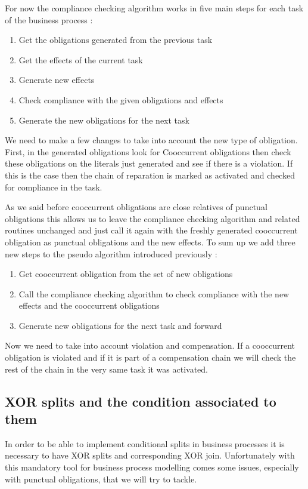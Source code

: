 \documentclass[10pt]{report}
\begin{document}
For now the compliance checking algorithm works in five main steps for each task of the business process :
\begin{enumerate}
\item Get the obligations generated from the previous task
\item Get the effects of the current task
\item Generate new effects
\item Check compliance with the given obligations and effects
\item Generate the new obligations for the next task
\end{enumerate}

We need to make a few changes to take into account the new type of obligation. First, in the generated obligations look for Cooccurrent obligations then check these obligations on the literals just generated and see if there is a violation. If this is the case then the chain of reparation is marked as activated and checked for compliance in the task.

As we said before cooccurrent obligations are close relatives of punctual obligations this allows us to leave the compliance checking algorithm and related routines unchanged and just call it again with the freshly generated cooccurrent obligation as punctual obligations and the new effects. To sum up we add three new steps to the pseudo algorithm introduced previously :
\begin{enumerate}
\item Get cooccurrent obligation from the set of new obligations
\item Call the compliance checking algorithm to check compliance with the new effects and the cooccurrent obligations
\item Generate new obligations for the next task and forward
\end{enumerate}

Now we need to take into account violation and compensation. If a cooccurrent obligation is violated and if it is part of a compensation chain we will check the rest of the chain in the very same task it was activated.



\subsection{XOR splits and the condition associated to them}
In order to be able to implement conditional splits in business processes it is necessary to have XOR splits and corresponding XOR join. Unfortunately with this mandatory tool for business process modelling comes some issues, especially with punctual obligations, that we will try to tackle.
\end{document}
